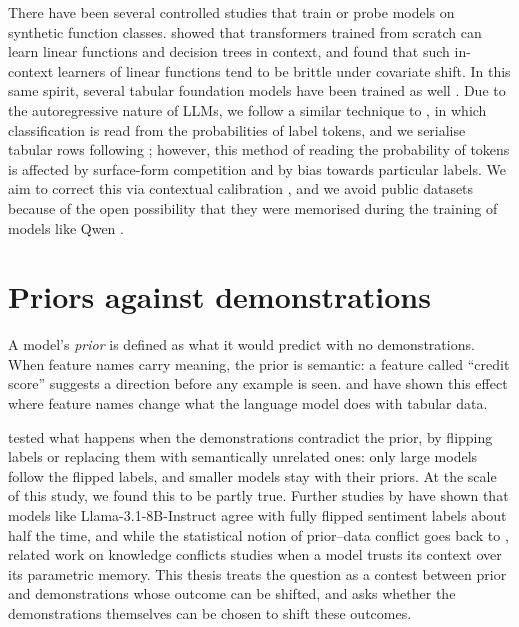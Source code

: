 There have been several controlled studies that train or probe models on synthetic function classes. \citet{garg2022what} showed that transformers trained from scratch can learn linear functions and decision trees in context, and \citet{zhang2024trained} found that such in-context learners of linear functions tend to be brittle under covariate shift. In this same spirit, several tabular foundation models have been trained as well \citep{hollmann2023tabpfn, muller2022transformers, hollmann2025accurate}. Due to the autoregressive nature of LLMs, we follow a similar technique to \citet{brown2020language}, in which classification is read from the probabilities of label tokens, and we serialise tabular rows following \citet{dinh2022lift, hegselmann2023tabllm}; however, this method of reading the probability of tokens is affected by surface-form competition \citep{holtzman2021surface} and by bias towards particular labels. We aim to correct this via contextual calibration \citep{zhao2021calibrate}, and we avoid public datasets because of the open possibility that they were memorised during the training of models like Qwen \citep{bordt2024elephants}.

\section{Priors against demonstrations}
\label{sec:bg-priors}

A model's \emph{prior} is defined as what it would predict with no demonstrations. When feature names carry meaning, the prior is semantic: a feature called ``credit score'' suggests a direction before any example is seen. \citet{dinh2022lift} and \citet{choi2022lmpriors} have shown this effect where feature names change what the language model does with tabular data. 

\citet{wei2023larger} tested what happens when the demonstrations contradict the prior, by flipping labels or replacing them with semantically unrelated ones: only large models follow the flipped labels, and smaller models stay with their priors. At the scale of this study, we found this to be partly true. Further studies by \citet{krishnakumar2025semantic} have shown that models like Llama-3.1-8B-Instruct agree with fully flipped sentiment labels about half the time, and while the statistical notion of prior--data conflict goes back to \citet{evans2006checking}, related work on knowledge conflicts \citep{longpre2021entity, xie2024adaptive} studies when a model trusts its context over its parametric memory. This thesis treats the question as a contest between prior and demonstrations whose outcome can be shifted, and asks whether the demonstrations themselves can be chosen to shift these outcomes.

